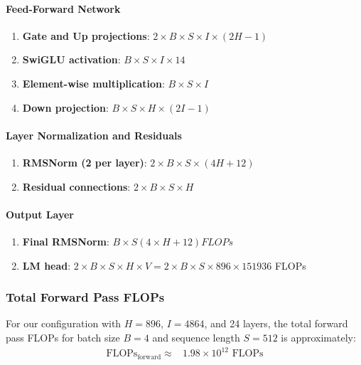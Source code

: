 \documentclass{article}
\begin{document}
\paragraph{Feed-Forward Network}
\begin{enumerate}
    \item \textbf{Gate and Up projections}: $2 \times B\times S \times I \times (2H - 1)$
    \item \textbf{SwiGLU activation}: $B\times S \times I \times 14$
    \item \textbf{Element-wise multiplication}: $B\times S \times I$
    \item \textbf{Down projection}: $B\times S \times H \times (2I - 1)$
\end{enumerate}

\paragraph{Layer Normalization and Residuals}
\begin{enumerate}
    \item \textbf{RMSNorm (2 per layer)}: $2 \times B\times S \times (4H + 12)$
    \item \textbf{Residual connections}: $2 \times B\times S \times H$
\end{enumerate}

\paragraph{Output Layer}
\begin{enumerate}
    \item \textbf{Final RMSNorm}: $ B \times S (4 \times H+12) FLOPs$
    \item \textbf{LM head}: $2 \times B \times S \times H \times V = 2 \times B \times S \times 896 \times 151936$ FLOPs
\end{enumerate}

\subsubsection*{Total Forward Pass FLOPs}

For our configuration with $H=896$, $I=4864$, and 24 layers, the total forward pass FLOPs for batch size $B=4$ and sequence length $S=512$ is approximately:
\begin{align}
\text{FLOPs}_{\text{forward}} \approx & 1.98 \times 10^{12} \text{ FLOPs} 
\end{align}
\end{document}
